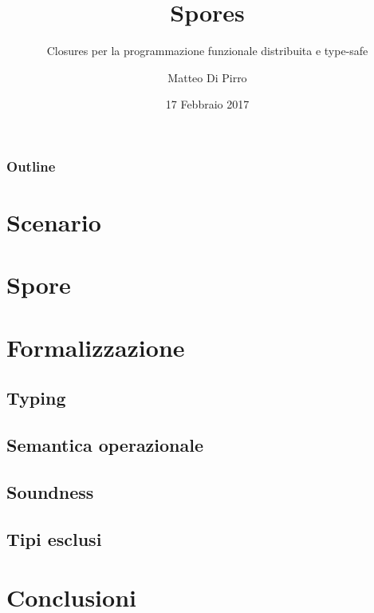\documentclass{beamer}
\title{Spores}
\subtitle{\newline Closures per la programmazione funzionale distribuita e type-safe}
\author{Matteo Di Pirro}
\date{17 Febbraio 2017}
\institute{Università degli Studi di Padova}
\begin{document}
\newcommand{\turnOffNumbers}{true} %

\begin{frame}[noframenumbering]
\titlepage
\end{frame}

\let\turnOffNumbers\empty
\begin{frame}
	\frametitle{Outline}
	\tableofcontents
\end{frame}

\section{Scenario}




\section{Spore}




\section{Formalizzazione}
\subsection{Typing}



\subsection{Semantica operazionale}



\subsection{Soundness}


\subsection{Tipi esclusi}


\section{Conclusioni}


\appendix
\makethanks
\renewcommand{\turnOffNumbers}{true} %
\end{document}
